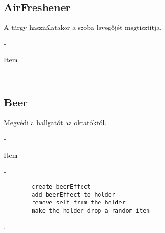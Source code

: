\subsection{AirFreshener}
\begin{class-template-responsibility}
    A tárgy használatakor a szoba levegőjét megtisztítja.
\end{class-template-responsibility}
\begin{class-template-interface}
    -
\end{class-template-interface}
\begin{class-template-baseclass}
    Item
\end{class-template-baseclass}
\begin{class-template-attribute}
    -
\end{class-template-attribute}
\begin{class-template-method}
\end{class-template-method}

\subsection{Beer}
\begin{class-template-responsibility}
    Megvédi a hallgatót az oktatóktól.
\end{class-template-responsibility}
\begin{class-template-interface}
    -
\end{class-template-interface}
\begin{class-template-baseclass}
    Item
\end{class-template-baseclass}
\begin{class-template-attribute}
    -
\end{class-template-attribute}
\begin{class-template-method}
    \begin{verbatim}
        create beerEffect
        add beerEffect to holder
        remove self from the holder
        make the holder drop a random item
    \end{verbatim}
    .
\end{class-template-method}

